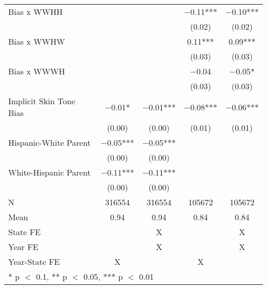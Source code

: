 \begin{longtable}[t]{lcccc}
Bias x WWHH &  &  & \num{-0.11}*** & \num{-0.10}***\\
 &  &  & (\num{0.02}) & (\num{0.02})\\
Bias x WWHW &  &  & \num{0.11}*** & \num{0.09}***\\
 &  &  & (\num{0.03}) & \vphantom{1} (\num{0.03})\\
Bias x WWWH &  &  & \num{-0.04} & \num{-0.05}*\\
 &  &  & (\num{0.03}) & (\num{0.03})\\
Implicit Skin Tone Bias & \num{-0.01}* & \num{-0.01}*** & \num{-0.08}*** & \num{-0.06}***\\
 & (\num{0.00}) & (\num{0.00}) & (\num{0.01}) & (\num{0.01})\\
Hispanic-White Parent & \num{-0.05}*** & \num{-0.05}*** &  & \\
 & (\num{0.00}) & (\num{0.00}) &  \vphantom{1} & \\
White-Hispanic Parent & \num{-0.11}*** & \num{-0.11}*** &  & \\
 & (\num{0.00}) & (\num{0.00}) &  & \\
\midrule
N & \num{316554} & \num{316554} & \num{105672} & \num{105672}\\
Mean & \num{0.94} & \num{0.94} & \num{0.84} & \num{0.84}\\
State FE &  & X &  & X\\
Year FE &  & X &  & X\\
Year-State FE & X &  & X & \\*
\multicolumn{5}{l}{\rule{0pt}{1em}* p $<$ 0.1, ** p $<$ 0.05, *** p $<$ 0.01}\\
\end{longtable}

